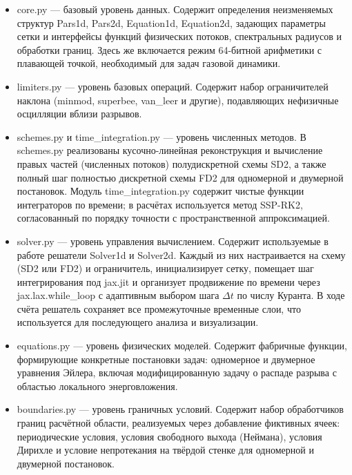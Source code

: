 \documentclass[a4paper,14pt]{extarticle}
\theoremstyle{theorem}
\theoremstyle{lemma}
\begin{document}
\begin{itemize}
    \item core.py --- базовый уровень данных. Содержит определения неизменяемых структур Pars1d, Pars2d, Equation1d, Equation2d, задающих параметры сетки и интерфейсы функций физических потоков, спектральных радиусов и обработки границ. Здесь же включается режим 64-битной арифметики с плавающей точкой, необходимый для задач газовой динамики.

    \item limiters.py --- уровень базовых операций. Содержит набор ограничителей наклона (minmod, superbee, van\_leer и другие), подавляющих нефизичные осцилляции вблизи разрывов.

    \item schemes.py и time\_integration.py --- уровень численных методов. В schemes.py реализованы кусочно-линейная реконструкция и вычисление правых частей (численных потоков) полудискретной схемы SD2, а также полный шаг полностью дискретной схемы FD2 для одномерной и двумерной постановок. Модуль time\_integration.py содержит чистые функции интеграторов по времени; в расчётах используется метод SSP-RK2, согласованный по порядку точности с пространственной аппроксимацией.

    \item solver.py --- уровень управления вычислением. Содержит используемые в работе решатели Solver1d и Solver2d. Каждый из них настраивается на схему (SD2 или FD2) и ограничитель, инициализирует сетку, помещает шаг интегрирования под jax.jit и организует продвижение по времени через jax.lax.while\_loop с адаптивным выбором шага $\Delta t$ по числу Куранта. В ходе счёта решатель сохраняет все промежуточные временные слои, что используется для последующего анализа и визуализации.

    \item equations.py --- уровень физических моделей. Содержит фабричные функции, формирующие конкретные постановки задач: одномерное и двумерное уравнения Эйлера, включая модифицированную задачу о распаде разрыва с областью локального энерговложения.

    \item boundaries.py --- уровень граничных условий. Содержит набор обработчиков границ расчётной области, реализуемых через добавление фиктивных ячеек: периодические условия, условия свободного выхода (Неймана), условия Дирихле и условие непротекания на твёрдой стенке для одномерной и двумерной постановок.

\end{itemize}
\end{document}
